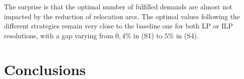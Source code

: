 \begin{bibunit}[ieeetr]
\bigskip
The surprise is that the optimal number of fulfilled demands are almost not impacted by the reduction of relocation arcs.
The optimal values following  the different strategies remain very close to the baseline one for both LP or ILP resolutions,
with a gap varying from $0,4$\% in (S1) to $5$\% in (S4).

\section{Conclusions}

\newpage
{}
\renewcommand{\bibname}{Bibliography of chapter \thechapter}
\end{bibunit}
